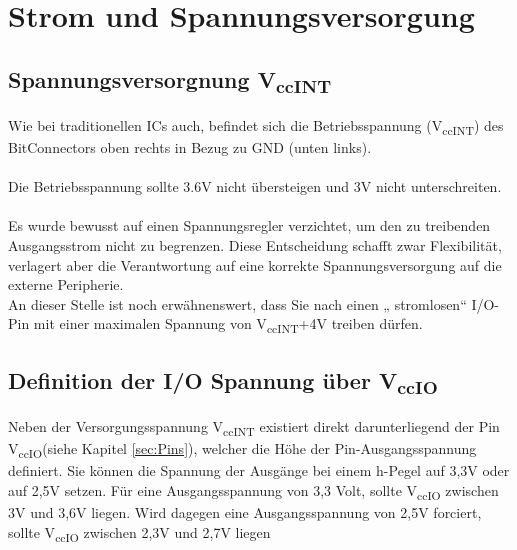 \documentclass{article}
\begin{document}
\section{Strom und Spannungsversorgung}

\subsection{Spannungsversorgnung V\textsubscript{ccINT}}
Wie bei traditionellen ICs auch, befindet sich die Betriebsspannung (V\textsubscript{ccINT}) des BitConnectors oben rechts  in Bezug zu GND (unten links).
\\\\
Die Betriebsspannung sollte 3.6V nicht übersteigen und 3V nicht unterschreiten. \autocite[3]{XC95_Spec}
\\\\
Es wurde bewusst auf einen Spannungsregler verzichtet, um den zu treibenden Ausgangsstrom nicht zu begrenzen. Diese Entscheidung schafft zwar Flexibilität, verlagert aber die Verantwortung auf eine korrekte Spannungsversorgung auf die externe Peripherie.\\
An dieser Stelle ist noch erwähnenswert, dass Sie nach \autocite[17]{XC95_maxI} einen „ stromlosen“ I/O-Pin mit einer maximalen Spannung von V\textsubscript{ccINT}+4V treiben dürfen.

\subsection{Definition der I/O Spannung über V\textsubscript{ccIO}}

Neben der Versorgungsspannung V\textsubscript{ccINT} existiert direkt darunterliegend der Pin V\textsubscript{ccIO}(siehe Kapitel \ref{sec:Pins}), welcher die Höhe der Pin-Ausgangsspannung definiert. Sie können die Spannung der Ausgänge bei einem h-Pegel auf 3,3V oder auf 2,5V setzen. Für eine Ausgangsspannung von 3,3 Volt, sollte V\textsubscript{ccIO} zwischen 3V und 3,6V liegen. Wird dagegen eine Ausgangsspannung von 2,5V forciert, sollte V\textsubscript{ccIO} zwischen 2,3V und 2,7V liegen \autocite[3]{XC95_Spec}
\end{document}
